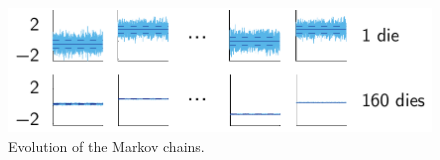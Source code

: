 \begin{figure}
  \centering
  \includegraphics[width=0.9\linewidth]{include/assets/chains.pdf}
  \caption{Evolution of the Markov chains.}
  \vspace{-1.5em}
\end{figure}
